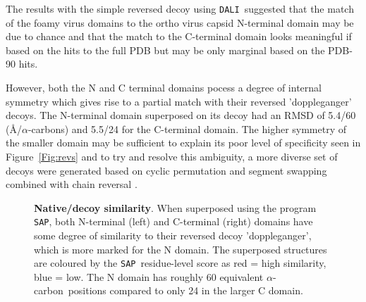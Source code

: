 \documentclass[12pt]{article}
\newcommand{\Fig}[1]{Figure~\ref{Fig:#1}}
\newcommand{\CA}{$\alpha$-carbon}
\newcommand{\3}{$3_{10}$}
\newcommand{\SAP}{{\tt SAP}}
\newcommand{\DALI}{{\tt DALI}}
\begin{document}
The results with the simple reversed decoy using \DALI\, suggested that the match of the foamy virus domains to the
ortho virus capsid N-terminal domain may be due to chance and that the match to the C-terminal domain looks 
meaningful if based on the hits to the full PDB but may be only marginal based on the PDB-90 hits. 

However, both the N and C terminal domains pocess a degree of internal symmetry which gives
rise to a partial match with their reversed 'doppleganger' decoys.   The N-terminal domain superposed on its decoy
had an RMSD of 5.4/60 (\AA/\CA s) and 5.5/24 for the C-terminal domain.   The higher symmetry of the smaller
domain may be sufficient to explain its poor level of specificity seen in \Fig{revs} and to try and resolve this
ambiguity, a more diverse set of decoys were generated based on cyclic permutation and segment swapping combined
with chain reversal \cite{TaylorWR06a}.

\begin{figure}
\centering
{}
\begin{footnotesize}
\caption{
\label{Fig:tows}
{\bf Native/decoy similarity}.
When superposed using the program \SAP, both N-terminal (left) and C-terminal (right) domains
have some degree of similarity to their reversed decoy 'doppleganger', which is more marked
for the N domain.   The superposed structures are coloured by the \SAP\ residue-level score as
red = high similarity, blue = low.  The N domain has roughly 60 equivalent \CA\ positions
compared to only 24 in the larger C domain.
}
\end{footnotesize}
\end{figure}
\end{document}
